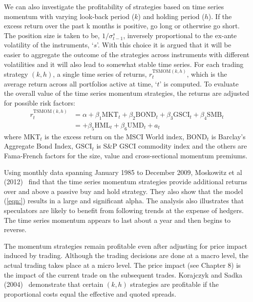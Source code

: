 We can also investigate the profitability of strategies based on time series momentum with varying look-back period ($k$) and holding period ($h$). If the excess return over the past k months is positive, go long or otherwise go short. The position size is taken to be, $1/\sigma_{t-1}^s$, inversely proportional to the ex-ante volatility of the instruments, `$s$'. With this choice it is argued that it will be easier to aggregate the outcome of the strategies across instruments with different volatilities and it will also lead to somewhat stable time series. For each trading strategy $(k,h)$, a single time series of returns, $r_t^{\text{TSMOM}(k,h)}$, which is the average return across all portfolios active at time, `$t$' is computed. To evaluate the overall value of the time series momentum strategies, the returns are adjusted for possible risk factors:
	\begin{equation}
	\begin{split}
	r_t^{\text{TSMOM}(k,h)}&= \alpha + \beta_1 \text{MKT}_t + \beta_2 \text{BOND}_t + \beta_3 \text{GSCI}_t + \beta_4 \text{SMB}_t \\
	&=  + \beta_5 \text{HML}_t + \beta_6 \text{UMD}_t + a_t 
	\end{split}
	\end{equation}
where $\text{MKT}_t$ is the excess return on the MSCI World index, $\text{BOND}_t$ is Barclay's Aggregate Bond Index, $\text{GSCI}_t$ is S\&P GSCI commodity index and the others are Fama-French factors for the size, value and cross-sectional momentum premiums.


Using monthly data spanning January 1985 to December 2009, Moskowitz et al (2012)~\cite{mos2012} find that the time series momentum strategies provide additional returns over and above a passive buy and hold strategy. They also show that the model (\ref{eqn:}) results in a large and significant alpha. The analysis also illustrates that speculators are likely to benefit from following trends at the expense of hedgers. The time series momentum appears to last about a year and then begins to reverse.


The momentum strategies remain profitable even after adjusting for price impact induced by trading. Although the trading decisions are done at a macro level, the actual trading takes place at a micro level. The price impact (see Chapter 8) is the impact of the current trade on the subsequent trades. Korajczyk and Sadka (2004)~\cite{kora2004} demonstrate that certain $(k,h)$ strategies are profitable if the proportional costs equal the effective and quoted spreads.


